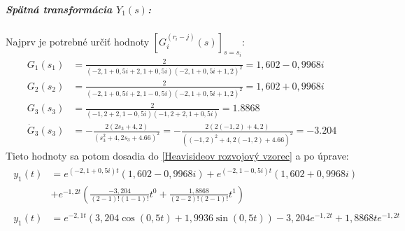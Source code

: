 \documentclass[a4paper, 10pt, ]{article}
\begin{document}
\subparagraph{Spätná transformácia $Y_1(s)$:}
Najprv je potrebné určiť hodnoty $\left[ G_i^{(r_i-j)} (s) \right]_{s = s_i}$:
\begin{subequations}
	\begin{align}
		G_1(s_1) &= \frac{2}{\left( -2,1 + 0,5i+2,1+0,5i \right)\left( -2,1 + 0,5i+1,2 \right)^2 } = 1,602 - 0,9968i \\
		G_2(s_2) &= \frac{2}{\left( -2,1 + 0,5i+2,1-0,5i \right)\left( -2,1 + 0,5i+1,2 \right)^2 } = 1,602 + 0,9968i \\
		G_3(s_3) &= \frac{2}{\left( -1,2+2,1-0,5i \right)\left( -1,2+2,1+0,5i \right)} = 1.8868 \\
		\dot{G}_3(s_3) &= - \frac{2\left( 2s_3 + 4,2 \right)}{\left( s_3^2 +4,2s_3 +4.66 \right)^2} = - \frac{2\left( 2(-1,2) + 4,2 \right)}{\left( (-1,2)^2 +4,2(-1,2) +4.66 \right)^2} = -3.204
	\end{align}
\end{subequations}
Tieto hodnoty sa potom dosadia do \eqref{Heavisideov rozvojový vzorec} a po úprave:
\begin{subequations}
	\begin{align}
		\begin{split}
			y_1(t) &= e^{(-2,1 + 0,5i)t}\left( 1,602 - 0,9968i \right) + e^{(-2,1 - 0,5i)t}\left( 1,602 + 0,9968i \right) \\
			       &+ e^{-1,2t}\left( \frac{-3,204}{(2-1)!(1-1)!}t^0 + \frac{1,8868}{(2-2)!(2-1)!}t^1\right)
		\end{split}	\\
		\begin{split}
			y_1(t) &= e^{-2,1t} \left( 3,204 \cos(0,5t) +1,9936 \sin(0,5t) \right) -3,204 e^{-1,2t} + 1,8868te^{-1,2t}
		\end{split}
	\end{align}
\end{subequations}
\end{document}
